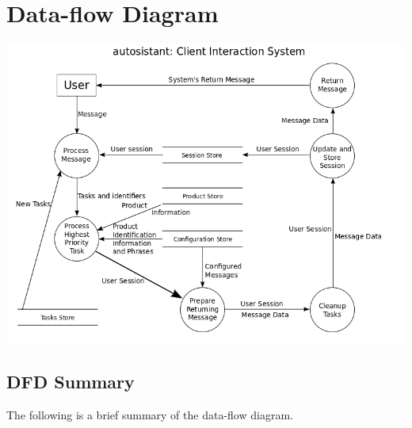 \documentclass[11pt, titlepage]{article}
\author{Graeme Douglas (76316090)}
\begin{document}
\section{Data-flow Diagram}
\includegraphics[scale=0.5]{project_dfd.png}
\subsection{DFD Summary}
The following is a brief summary of the data-flow diagram.
\end{document}
